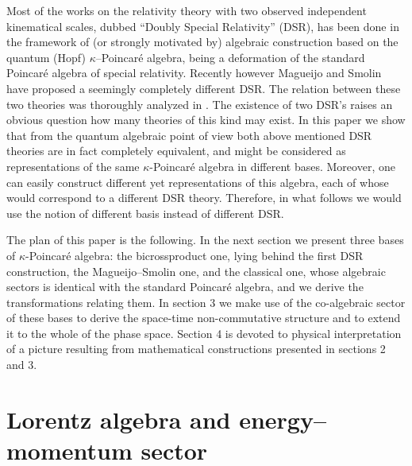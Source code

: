 \documentclass[a4paper,a4paper]{article}
\begin{document}
Most of the works on the relativity theory with two observed
independent kinematical scales,   dubbed ``Doubly Special
Relativity'' (DSR), has been done  in the framework of (or
strongly motivated by) algebraic construction based on the quantum
(Hopf) $\kappa$--Poincar\'e algebra, being a deformation of the
standard Poincar\'e algebra of special relativity. Recently
however Magueijo and Smolin \cite{JoaoLee} have proposed a
seemingly completely different DSR. The relation between these two
theories was thoroughly analyzed in \cite{gacandstud}. The
existence of two DSR's raises an obvious question  how many
theories of this kind may exist. In this paper we show that from
the quantum algebraic point of view both above mentioned DSR
theories are in fact completely equivalent, and might be
considered as  representations of the same $\kappa$-Poincar\'e
algebra in different bases. Moreover, one can easily construct
different yet representations of this algebra, each of whose would
correspond to a different DSR theory. Therefore, in what follows
we would use the notion of different basis instead of different
DSR.

The plan of this paper is the following. In the next section we
present three bases of $\kappa$-Poincar\'e algebra:  the
bicrossproduct one, lying behind the first DSR construction, the
Magueijo--Smolin one, and the classical one, whose algebraic
sectors is identical with the standard Poincar\'e algebra, and we
derive the transformations relating them. In section 3 we make use
of the co-algebraic sector of these bases to derive the space-time
non-commutative structure and to extend it to the whole of the
phase space. Section 4 is devoted to physical interpretation of a
picture resulting from mathematical constructions presented in
sections 2 and 3.

\section{Lorentz algebra and energy--momentum sector}
\end{document}
